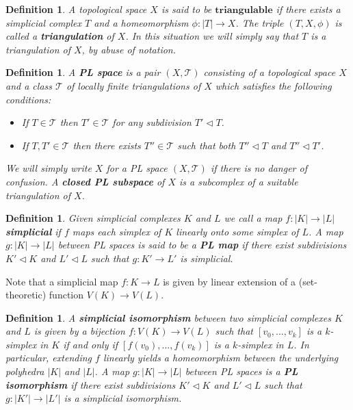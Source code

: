 \documentclass{scrreprt}
\newtheorem{definition}[prop]{Definition}
\begin{document}
\begin{definition}
A topological space $X$ is said to be $\mathbf{triangulable}$ if there exists a simplicial complex $T$ and a homeomorphism $\phi : |T| \to X$. The triple $(T,X, \phi)$ is called a \textbf{triangulation} of $X$. In this situation we will simply say that $T$ is a triangulation of $X$, by abuse of notation.
\end{definition}


\begin{definition}
A \textbf{PL space} is a pair $(X,\mathcal{T})$ consisting of a topological space $X$ and a class $\mathcal{T}$ of locally finite triangulations of $X$ which satisfies the following conditions:
\begin{itemize}
\item If $T \in \mathcal{T}$ then $T' \in \mathcal{T}$ for any subdivision $T' \lhd T$.
\item If $T,T' \in \mathcal{T}$ then there exists $T'' \in \mathcal{T}$ such that both $T'' \lhd T$ and $T'' \lhd T'$.
\end{itemize}
We will simply write $X$ for a PL space $(X,\mathcal{T})$ if there is no danger of confusion. A \textbf{closed PL subspace} of $X$ is a subcomplex of a suitable triangulation of $X$.
\end{definition}

\begin{definition}
Given simplicial complexes $K$ and $L$ we call a map $f: |K| \to |L|$ \textbf{simplicial} if $f$ maps each simplex of $K$ linearly onto some simplex of $L$. A map $g: |K| \to |L|$ between PL spaces  is said to be a \textbf{PL map} if there exist subdivisions $K' \lhd K$ and $L' \lhd L$ such that $g: K' \to L' $ is simplicial.
\end{definition}
Note that a simplicial map $f: K \to L$ is given by linear extension of a (set-theoretic) function $V(K) \to V(L)$.

\begin{definition}
A \textbf{simplicial isomorphism} between two simplicial complexes $K$ and $L$ is given by a bijection $f : V(K) \to V(L)$ such that $[v_0,...,v_k]$ is a $k$-simplex in $K$ if and only if $[f(v_0),...,f(v_k)]$ is a $k$-simplex in $L$. In particular, extending $f$ linearly yields a homeomorphism between the underlying polyhedra $|K|$ and $|L|$. A map $g: |K| \to |L|$ between PL spaces is a \textbf{PL isomorphism} if there exist subdivisions $K' \lhd K$ and $L' \lhd L$ such that $g: |K'| \to |L'|$ is a simplicial isomorphism.
\end{definition}
\end{document}
